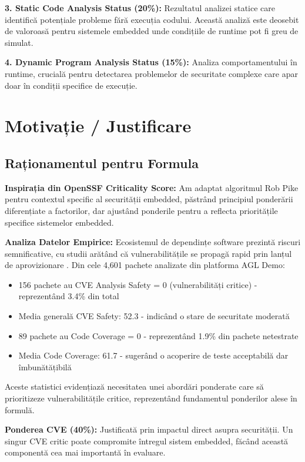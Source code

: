 \documentclass[12pt,a4paper]{article}
\begin{document}
\textbf{3. Static Code Analysis Status (20\%):} Rezultatul analizei statice care identifică potențiale probleme fără execuția codului. Această analiză este deosebit de valoroasă pentru sistemele embedded unde condițiile de runtime pot fi greu de simulat.

\textbf{4. Dynamic Program Analysis Status (15\%):} Analiza comportamentului în runtime, crucială pentru detectarea problemelor de securitate complexe care apar doar în condiții specifice de execuție.

\section{Motivație / Justificare}

\subsection{Raționamentul pentru Formula}

\textbf{Inspirația din OpenSSF Criticality Score:} Am adaptat algoritmul Rob Pike \cite{pike2019criticality} pentru contextul specific al securității embedded, păstrând principiul ponderării diferențiate a factorilor, dar ajustând ponderile pentru a reflecta prioritățile specifice sistemelor embedded.

\textbf{Analiza Datelor Empirice:} Ecosistemul de dependințe software prezintă riscuri semnificative, cu studii arătând că vulnerabilitățile se propagă rapid prin lanțul de aprovizionare \cite{zimmermann2019small,decan2018impact,ohm2020backstabbers}. Din cele 4,601 pachete analizate din platforma AGL Demo:

\begin{itemize}
\item 156 pachete au CVE Analysis Safety = 0 (vulnerabilități critice) - reprezentând 3.4\% din total
\item Media generală CVE Safety: 52.3 - indicând o stare de securitate moderată
\item 89 pachete au Code Coverage = 0 - reprezentând 1.9\% din pachete netestrate
\item Media Code Coverage: 61.7 - sugerând o acoperire de teste acceptabilă dar îmbunătățibilă
\end{itemize}

Aceste statistici evidențiază necesitatea unei abordări ponderate care să prioritizeze vulnerabilitățile critice, reprezentând fundamentul ponderilor alese în formulă.

\textbf{Ponderea CVE (40\%):} Justificată prin impactul direct asupra securității. Un singur CVE critic poate compromite întregul sistem embedded, făcând această componentă cea mai importantă în evaluare.
\end{document}
